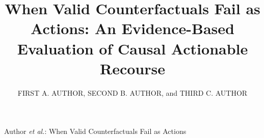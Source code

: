 \documentclass[nolineno]{paper/ieee-access/ieeeaccess}%
\let\AccessPublicationYear\year
\let\year\TeXPrimitiveYear
\begin{document}
\vol{--}\AccessPublicationYear{2026}
\title{When Valid Counterfactuals Fail as Actions: An Evidence-Based Evaluation of Causal Actionable Recourse}
\author{\uppercase{First A. Author}, \uppercase{Second B. Author}, and \uppercase{Third C. Author}}
\address[1]{Department of Computer Science, University/Institution Name, City, Postal Code, Country (e-mail: author1@institution.edu).}
\address[2]{Department of Electrical and Computer Engineering, University/Institution Name, City, Postal Code, Country (e-mail: author2@institution.edu).}
\address[3]{School of Information, University/Institution Name, City, Postal Code, Country (e-mail: author3@institution.edu).}
         {Author \emph{et al.}: When Valid Counterfactuals Fail as Actions}
\end{document}
